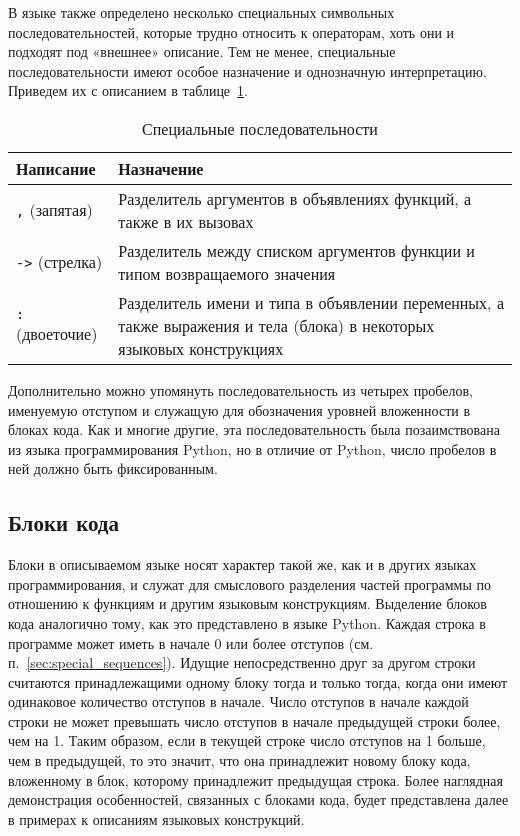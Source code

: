 В языке также определено несколько специальных символьных последовательностей, которые трудно относить к операторам, хоть они и подходят под «внешнее» описание.
Тем не менее, специальные последовательности имеют особое назначение и однозначную интерпретацию.
Приведем их с описанием в таблице~\ref{tab:special_sequences}.

\begin{table}[h]
    \centering
    \caption{Специальные последовательности}
    \label{tab:special_sequences}
    \begin{tabular}{p{3cm}p{12cm}}
        \toprule
        \textbf{Написание}   & \textbf{Назначение}                                                                                                  \\
        \midrule
        \verb|,| (запятая)   & Разделитель аргументов в объявлениях функций, а также в их вызовах                                                   \\
        \addlinespace
        \verb|->| (стрелка)  & Разделитель между списком аргументов функции и типом возвращаемого значения                                          \\
        \addlinespace
        \verb|:| (двоеточие) & Разделитель имени и типа в объявлении переменных, а также выражения и тела (блока) в некоторых языковых конструкциях \\
        \bottomrule
    \end{tabular}
\end{table}

Дополнительно можно упомянуть последовательность из четырех пробелов, именуемую отступом и служащую для обозначения уровней вложенности в блоках кода.
Как и многие другие, эта последовательность была позаимствована из языка программирования Python, но в отличие от Python, число пробелов в ней должно быть фиксированным.

\subsection{Блоки кода}

Блоки в описываемом языке носят характер такой же, как и в других языках программирования, и служат для смыслового разделения частей программы по отношению к функциям и другим языковым конструкциям.
Выделение блоков кода аналогично тому, как это представлено в языке Python.
Каждая строка в программе может иметь в начале 0 или более отступов (см. п.~\ref{sec:special_sequences}).
Идущие непосредственно друг за другом строки считаются принадлежащими одному блоку тогда и только тогда, когда они имеют одинаковое количество отступов в начале.
Число отступов в начале каждой строки не может превышать число отступов в начале предыдущей строки более, чем на 1.
Таким образом, если в текущей строке число отступов на 1 больше, чем в предыдущей, то это значит, что она принадлежит новому блоку кода, вложенному в блок, которому принадлежит предыдущая строка.
Более наглядная демонстрация особенностей, связанных с блоками кода, будет представлена далее в примерах к описаниям языковых конструкций.

